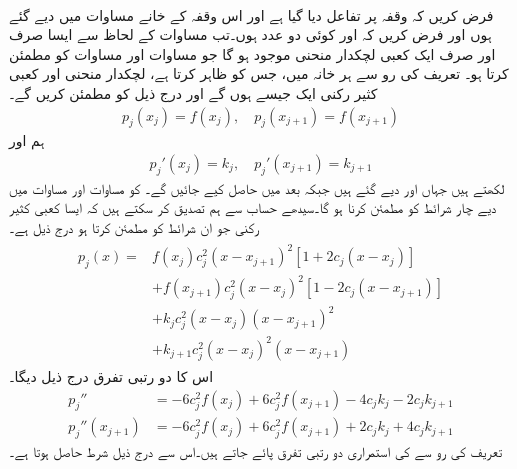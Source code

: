 \quad {}\\
فرض کریں کہ وقفہ  پر تفاعل  دیا گیا ہے اور اس وقفہ کے خانے مساوات  میں دیے گئے ہوں اور فرض کریں کہ  اور  کوئی دو عدد ہوں۔تب مساوات  کے لحاظ سے ایسا صرف اور صرف ایک کعبی لچکدار منحنی  موجود ہو گا جو مساوات  اور مساوات  کو مطمئن کرتا ہو۔
\quad
تعریف کی رو سے ہر خانہ  میں، جس کو  ظاہر کرتا ہے، لچکدار منحنی   اور کعبی کثیر رکنی  ایک جیسے ہوں گے اور درج ذیل کو مطمئن کریں گے۔
\begin{align}\label{مساوات_اعدادی_لچکدار_منحنی_ٹکڑے_ت}
p_j(x_j)=f(x_j),\quad p_j(x_{j+1})=f(x_{j+1})
\end{align}
ہم  اور
\begin{align}\label{مساوات_اعدادی_لچکدار_منحنی_ٹکڑے_ٹ}
p_j'(x_j)=k_j,\quad p_j'(x_{j+1})=k_{j+1}
\end{align}
لکھتے ہیں جہاں  اور  دیے گئے ہیں جبکہ  بعد میں حاصل کیے جائیں گے۔ کو مساوات  اور مساوات  میں دیے چار شرائط کو مطمئن کرنا ہو گا۔سیدھے حساب سے ہم تصدیق کر سکتے ہیں کہ ایسا کعبی کثیر رکنی  جو ان شرائط کو مطمئن کرتا ہو درج ذیل ہے۔
\begin{gather}
\begin{aligned}\label{مساوات_اعدادی_لچکدار_منحنی_ٹکڑے_ث}
p_j(x)=&f(x_j)c_j^2(x-x_{j+1})^2[1+2c_j(x-x_j)]\\
&+f(x_{j+1})c_j^2(x-x_j)^2[1-2c_j(x-x_{j+1})]\\
&+k_jc_j^2(x-x_j)(x-x_{j+1})^2\\
&+k_{j+1}c_j^2(x-x_j)^2(x-x_{j+1})
\end{aligned}
\end{gather}
اس کا دو رتبی تفرق درج ذیل دیگا۔
\begin{align}
p_j''&=-6c_j^2f(x_j)+6c_j^2f(x_{j+1})-4c_jk_j-2c_jk_{j+1}\label{مساوات_اعدادی_دو_درجی_تفرق_الف}\\
p_j''(x_{j+1})&=-6c_j^2f(x_j)+6c_j^2f(x_{j+1})+2c_jk_j+4c_jk_{j+1}\label{مساوات_اعدادی_دو_درجی_تفرق_ب}
\end{align}
تعریف کی رو سے  کی استمراری دو رتبی تفرق پائے جاتے ہیں۔اس سے درج ذیل شرط حاصل ہوتا ہے۔
